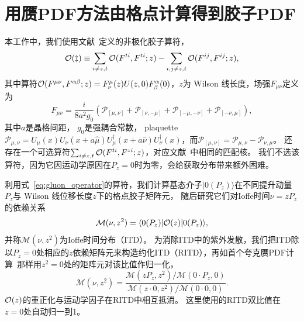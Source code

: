 \section{用赝PDF方法由格点计算得到胶子PDF}\label{sec:cal-details}

本工作中，我们使用文献~\cite{Balitsky:2019krf}定义的非极化胶子算符，
%
\begin{equation}\label{eq:gluon_operator}
 {\cal O(z)}\equiv\sum_{i\neq z,t}{\cal O}(F^{ti},F^{ti};z)-\sum_{i,j\neq z,t}{\cal O}(F^{ij},F^{ij};z),
\end{equation}
%
其中算符${\cal O}(F^{\mu\nu}, F^{\alpha\beta};z) = F^\mu_\nu(z)U(z,0)F^{\alpha}_{\beta}(0)$，$z$为 Wilson 线长度，场强$F_{\mu\nu}$定义为
%
\begin{equation}\label{}
 F_{\mu\nu} = \frac{i}{8a^2g_0}\left(\mathcal{P}_{[\mu,\nu]}+\mathcal{P}_{[\nu,-\mu]}+\mathcal{P}_{[-\mu,-\nu]}+\mathcal{P}_{[-\nu,\mu]}\right),
\end{equation}
%
其中$a$是晶格间距，
$g_0$是强耦合常数，
plaquette $\mathcal{P_{\mu,\nu}}=U_{\mu}(x)U_{\nu}(x+a\hat{\mu})U^{\dag}_{\mu}(x+a\hat{\nu})U^{\dag}_{\nu}(x)$，而$\mathcal{P_{[\mu,\nu]}}=\mathcal{P}_{\mu,\nu}-\mathcal{P}_{\nu,\mu}$。
还存在一个可选算符$\sum_{i\neq z,t}{\cal O}(F^{ti},F^{zi};z)$，对应文献~\cite{Balitsky:2019krf}中相同的匹配核。
我们不选该算符，因为它因运动学原因在$P_z=0$时为零，会给获取分布带来额外困难。

利用式~\ref{eq:gluon_operator}的算符，我们计算基态介子$|0 (P_z) \rangle$在不同提升动量$P_z$与 Wilson 线位移长度$z$下的格点胶子矩阵元，
随后研究它们对Ioffe时间$\nu=zP_z$的依赖关系
%
\begin{equation}
\mathcal{M}(\nu,z^2) = \langle 0 (P_z)|{\cal O}(z)|0 (P_z)\rangle,
\label{eq:ME_unpol}
\end{equation}
%
并称$\mathcal{M}(\nu,z^2)$为Ioffe时间分布（ITD）。
为消除ITD中的紫外发散，我们把ITD除以$P_z=0$处相应的$z$依赖矩阵元来构造约化ITD（RITD），再如首个夸克赝PDF计算~\cite{Orginos:2017kos}那样用$z^2=0$处的矩阵元对该比值作归一化，
%
\begin{equation}
\mathscr{M}(\nu,z^2)=
\frac{\mathcal{M}(zP_z,z^2)/\mathcal{M}(0\cdot P_z,0)}{\mathcal{M}(z\cdot 0,z^2)/\mathcal{M}(0\cdot 0,0)}.
\label{eq:RITD}
\end{equation}
%
${\cal O}(z)$的重正化与运动学因子在RITD中相互抵消。
这里使用的RITD双比值在$z=0$处自动归一到1。

